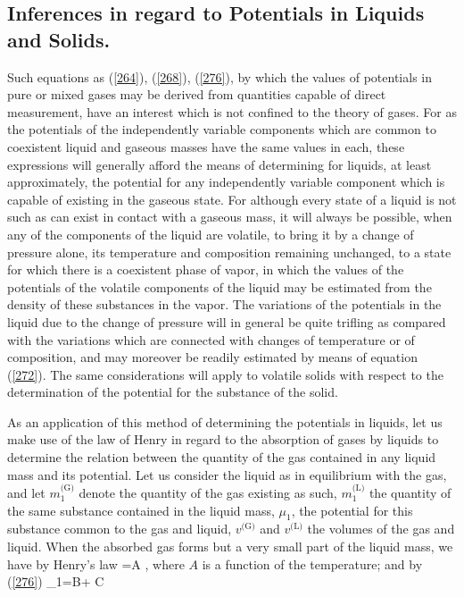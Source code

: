 \documentclass[12pt]{article}
\begin{document}
\subsection{Inferences in regard to Potentials in Liquids and Solids.}
Such equations as (\ref{264}), (\ref{268}), (\ref{276}), by which the values of potentials in pure or mixed gases may be derived from quantities capable of direct measurement, have an interest which is not confined to the theory of gases. For as the potentials of the independently variable components which are common to coexistent liquid and gaseous masses have the same values in each, these expressions will generally afford the means of determining for liquids, at least approximately, the potential for any independently variable component which is capable of existing in the gaseous state. For although every state of a liquid is not such as can exist in contact with a gaseous mass, it will always be possible, when any of the components of the liquid are volatile, to bring it by a change of pressure alone, its temperature and composition remaining unchanged, to a state for which there is a coexistent phase of vapor, in which the values of the potentials of the volatile components of the liquid may be estimated from the density of these substances in the vapor. The variations of the potentials in the liquid due to the change of pressure will in general be quite trifling as compared with the variations which are connected with changes of temperature or of composition, and may moreover be readily estimated by means of equation (\ref{272}). The same considerations will apply to volatile solids with respect to the determination of the potential for the substance of the solid.


As an application of this method of determining the potentials in liquids, let us make use of the law of Henry in regard to the absorption of gases by liquids to determine the relation between the quantity of the gas contained in any liquid mass and its potential. Let us consider the liquid as in equilibrium with the gas, and let $m_1^\text{(G)}$ denote the quantity of the gas existing as such, $m_1^\text{(L)}$ the quantity of the same substance contained in the liquid mass, $\mu_1$, the potential for this substance common to the gas and liquid, $v^\text{(G)}$ and $v^\text{(L)}$ the volumes of the gas and liquid. When the absorbed gas forms but a very small part of the liquid mass, we have by Henry's law
\eqs {}=A ,      \label{294}\eqe
where $A$ is a function of the temperature; and by (\ref{276})
\eqs \mu_1=B+ C \log {}   \label{295}\eqe
\end{document}
